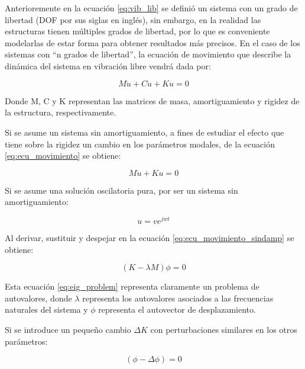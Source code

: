 Anterioremente en la ecuación \ref{eq:vib_lib} se definió un sistema con un grado de libertad (DOF por sus siglas en inglés), sin embargo, en la realidad las estructuras tienen múltiples grados de libertad, por lo que es conveniente modelarlas de estar forma para obtener resultados más precisos. En el caso de los sistemas con ``n grados de libertad'', la ecuación de movimiento que describe la dinámica del sistema en vibración libre vendrá dada por:

\begin{equation} \label{eq:ecu_movimiento}
    M\ddot{u} + C\dot{u} + Ku = 0
\end{equation}

Donde M, C y K representan las matrices de masa, amortiguamiento y rigidez de la estructura, respectivamente.

Si se asume un sistema sin amortiguamiento, a fines de estudiar el efecto que tiene sobre la rigidez un cambio en los parámetros modales,  de la ecuación \ref{eq:ecu_movimiento} se obtiene: 

\begin{equation} \label{eq:ecu_movimiento_sindamp}
    M\ddot{u} + Ku = 0
\end{equation}

Si se asume una solución oscilatoria pura, por ser un sistema sin amortiguamiento:

\begin{equation} \label{eq:sol_ecu_motion}
    u = ve^{jwt}
\end{equation}

Al derivar, sustituir y despejar en la ecuación \ref{eq:ecu_movimiento_sindamp} se obtiene:

\begin{equation} \label{eq:eig_problem}
    (K - \lambda M)\phi = 0
\end{equation}

Esta ecuación \ref{eq:eig_problem} representa claramente un problema de autovalores, donde $\lambda$ representa los autovalores asociados a las frecuencias naturales del sistema y $\phi$ representa el autovector de desplazamiento.

Si se introduce un pequeño cambio $\Delta K$ con perturbaciones similares en los otros parámetros:

\begin{equation}
    [(K - \Delta K) - (\lambda - \Delta\lambda)(M - \Delta M)](\phi - \Delta\phi) = 0
\end{equation}

